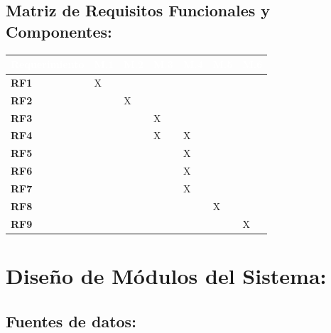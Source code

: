 \documentclass[12pt,a4paper]{article}
\begin{document}
                
    \subsection{\textbf{Matriz de Requisitos Funcionales y Componentes:}}
                
                    \begin{table}[H]
                        \centering
                        \begin{tabularx}{\textwidth}{|X|p{1cm}|p{1cm}|p{1cm}|p{1cm}|p{1cm}|p{1cm}|}
                            \hline
                            \rowcolor{black} 
                            \textcolor{white}{Requerimiento} & \textcolor{white}{M.1} & \textcolor{white}{M.2} & \textcolor{white}{M.3} & \textcolor{white}{M.4} & \textcolor{white}{M.5} & \textcolor{white}{M.6}  \\ \hline
                            
                            \textbf{RF1} & X & & & & & \\ \hline
                            \textbf{RF2} & & X & & & & \\ \hline
                            \textbf{RF3} & & & X & & & \\ \hline
                            \textbf{RF4} & & & X & X & &  \\ \hline
                            \textbf{RF5} & & & & X & & \\ \hline
                            \textbf{RF6} & & & & X & & \\ \hline
                            \textbf{RF7} & & & & X &  & \\ \hline
                            \textbf{RF8} & & & &  & X & \\ \hline
                            \textbf{RF9} & & & &  &  & X \\ \hline
                        \end{tabularx}
                    \end{table}
    
    \section{Diseño de Módulos del Sistema:}
    \subsection{Fuentes de datos:}
\end{document}
